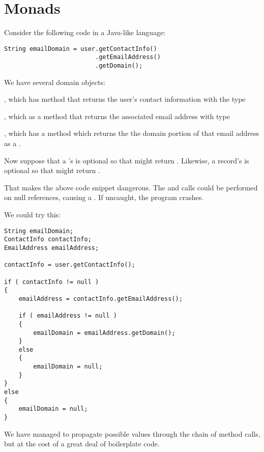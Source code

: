 \section{Monads}

Consider the following code in a Java-like language:

\begin{lstlisting}
String emailDomain = user.getContactInfo()
                         .getEmailAddress()
                         .getDomain();
\end{lstlisting}

We have several domain objects:

\begin{notelist}
    \item {}, which has method  that returns the user's contact information with the type 
    \item {}, which as a method  that returns the associated email address with type
    \item {}, which has a method  which returns the the domain portion of that email address as a .
\end{notelist}

Now suppose that a 's  is optional so that  might return . Likewise,
a  record's  is optional so that  might return .

That makes the above code snippet dangerous. The  and  calls could be performed on null
references, causing a . If uncaught, the program crashes.

We could try this:

\begin{lstlisting}
String emailDomain;
ContactInfo contactInfo;
EmailAddress emailAddress;

contactInfo = user.getContactInfo();

if ( contactInfo != null )
{
    emailAddress = contactInfo.getEmailAddress();

    if ( emailAddress != null )
    {
        emailDomain = emailAddress.getDomain();
    }
    else
    {
        emailDomain = null;
    }
}
else
{
    emailDomain = null;
}
\end{lstlisting}

We have managed to propagate possible  values through the chain of method calls, but at the cost of a great deal of 
boilerplate code.

